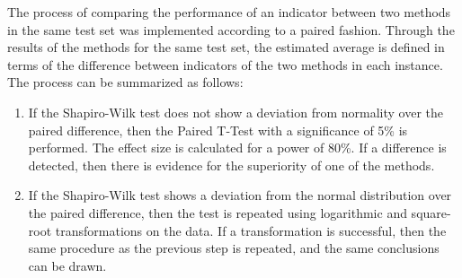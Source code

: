 			The process of comparing the performance of an indicator between two methods in the same test set was implemented according to a paired fashion. Through the results of the methods for the same test set, the estimated average is defined in terms of the difference between indicators of the two methods in each instance.  The process can be summarized as follows:
			\begin{enumerate}
				\item If the Shapiro-Wilk test does not show a deviation from normality over the paired difference, then the Paired T-Test with a significance of 5\% is performed. The effect size is calculated for a power of 80\%. If a difference is detected, then there is evidence for the superiority of one of the methods. %
				\item If the Shapiro-Wilk test shows a deviation from the normal distribution over the paired difference, then the test is repeated using logarithmic and square-root transformations on the data. If a transformation is successful, then the same procedure as the previous step is repeated, and the same conclusions can be drawn.

\end{enumerate}
